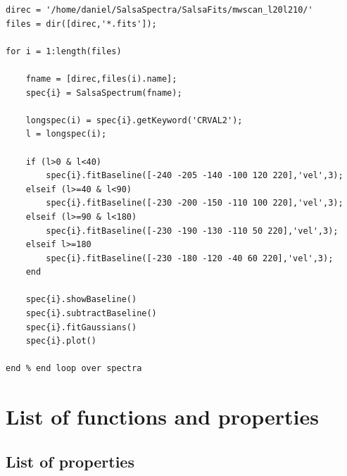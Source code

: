 \documentclass[11pt,a4paper]{article}
\begin{document}

\begin{lstlisting}
direc = '/home/daniel/SalsaSpectra/SalsaFits/mwscan_l20l210/'
files = dir([direc,'*.fits']);

for i = 1:length(files)

    fname = [direc,files(i).name];
    spec{i} = SalsaSpectrum(fname);
    
    longspec(i) = spec{i}.getKeyword('CRVAL2');
    l = longspec(i);
        
    if (l>0 & l<40)
        spec{i}.fitBaseline([-240 -205 -140 -100 120 220],'vel',3);
    elseif (l>=40 & l<90)
        spec{i}.fitBaseline([-230 -200 -150 -110 100 220],'vel',3);
    elseif (l>=90 & l<180)
        spec{i}.fitBaseline([-230 -190 -130 -110 50 220],'vel',3);
    elseif l>=180
        spec{i}.fitBaseline([-230 -180 -120 -40 60 220],'vel',3);        
    end
    
    spec{i}.showBaseline()    
    spec{i}.subtractBaseline()
    spec{i}.fitGaussians()
    spec{i}.plot()  

end % end loop over spectra
\end{lstlisting}


\newpage

\section{List of functions and properties}
\label{sec:list-funct-param}

\subsection{List of properties}
\label{sec:list-properties}
\end{document}
